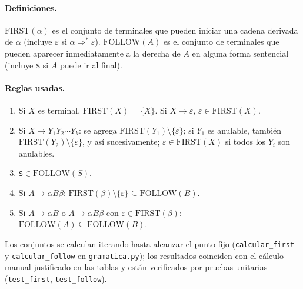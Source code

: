 \paragraph{Definiciones.} $\mathrm{FIRST}(\alpha)$ es el conjunto de terminales que pueden iniciar una cadena derivada de $\alpha$
(incluye $\varepsilon$ si $\alpha\Rightarrow^{*}\varepsilon$). $\mathrm{FOLLOW}(A)$ es el conjunto de terminales que pueden aparecer
inmediatamente a la derecha de $A$ en alguna forma sentencial (incluye \texttt{\$} si $A$ puede ir al final).

\paragraph{Reglas usadas.}
\begin{enumerate}[nosep]
\item Si $X$ es terminal, $\mathrm{FIRST}(X)=\{X\}$. Si $X\to\varepsilon$, $\varepsilon\in\mathrm{FIRST}(X)$.
\item Si $X\to Y_1Y_2\cdots Y_k$: se agrega $\mathrm{FIRST}(Y_1)\setminus\{\varepsilon\}$; si $Y_1$ es anulable, también $\mathrm{FIRST}(Y_2)\setminus\{\varepsilon\}$, y así sucesivamente; $\varepsilon\in\mathrm{FIRST}(X)$ si todos los $Y_i$ son anulables.
\item \texttt{\$}$\in\mathrm{FOLLOW}(S)$.
\item Si $A\to\alpha B\beta$: $\mathrm{FIRST}(\beta)\setminus\{\varepsilon\}\subseteq\mathrm{FOLLOW}(B)$.
\item Si $A\to\alpha B$ o $A\to\alpha B\beta$ con $\varepsilon\in\mathrm{FIRST}(\beta)$: $\mathrm{FOLLOW}(A)\subseteq\mathrm{FOLLOW}(B)$.
\end{enumerate}
Los conjuntos se calculan iterando hasta alcanzar el punto fijo (\texttt{calcular\_first} y \texttt{calcular\_follow} en
\texttt{gramatica.py}); los resultados coinciden con el cálculo manual justificado en las tablas y están verificados por
pruebas unitarias (\texttt{test\_first}, \texttt{test\_follow}).

